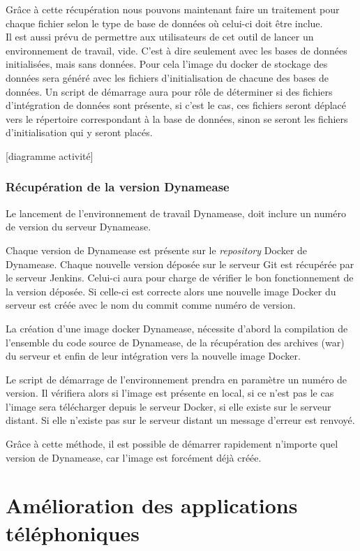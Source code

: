 Grâce à cette récupération nous pouvons maintenant faire un traitement pour chaque fichier selon le type de base de données où celui-ci doit être inclue.\\

Il est aussi prévu de permettre aux utilisateurs de cet outil de lancer un environnement de travail, vide. C'est à dire seulement avec les bases de données initialisées, mais sans données. Pour cela l'image du docker de stockage des données sera généré avec les fichiers d'initialisation de chacune des bases de données. Un script de démarrage aura pour rôle de déterminer si des fichiers d'intégration de données sont présente, si c'est le cas, ces fichiers seront déplacé vers le répertoire correspondant à la base de données, sinon se seront les fichiers d'initialisation qui y seront placés. 

[diagramme activité]

\subsubsection{Récupération de la version Dynamease}

Le lancement de l'environnement de travail Dynamease, doit inclure un numéro de version du serveur Dynamease. 

Chaque version de Dynamease est présente sur le \textit{repository} Docker de Dynamease. Chaque nouvelle version déposée sur le serveur Git est récupérée par le serveur Jenkins. Celui-ci aura pour charge de vérifier le bon fonctionnement de la version déposée. Si celle-ci est correcte alors une nouvelle image Docker du serveur est créée avec le nom du commit comme numéro de version.

La création d'une image docker Dynamease, nécessite d'abord la compilation de l'ensemble du code source de Dynamease, de la récupération des archives (war) du serveur et enfin de leur intégration vers la nouvelle image Docker.

Le script de démarrage de l'environnement prendra en paramètre un numéro de version. Il vérifiera alors si l'image est présente en local, si ce n'est pas le cas l'image sera télécharger depuis le serveur Docker, si elle existe sur le serveur distant. Si elle n'existe pas sur le serveur distant un message d'erreur est renvoyé.

Grâce à cette méthode, il est possible de démarrer rapidement n'importe quel version de Dynamease, car l'image est forcément déjà créée.

\section{Amélioration des applications téléphoniques}

